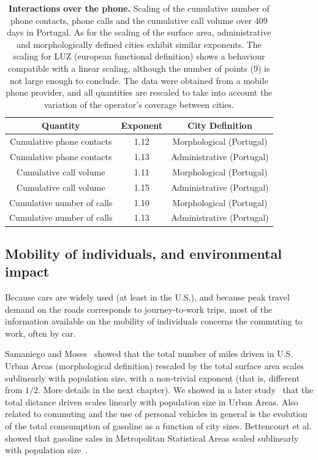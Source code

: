 \begin{table}[!h]
    \centering
\begin{tabular}{|ccc|}
\hline
Quantity & Exponent & City Definition\\
\hline
Cumulative phone contacts & 1.12 & Morphological (Portugal)\\
Cumulative phone contacts & 1.13 & Administrative (Portugal)\\
\hline
Cumulative call volume & 1.11 & Morphological (Portugal)\\
Cumulative call volume & 1.15 & Administrative (Portugal)\\
\hline
Cumulative number of calls & 1.10 & Morphological (Portugal)\\
Cumulative number of calls & 1.13 & Administrative (Portugal)\\
\hline
\end{tabular}
\caption{{\bf Interactions over the phone.} Scaling of the cumulative number of
    phone contacts, phone calls and the cumulative call volume over $409$ days
    in Portugal. As for the scaling of the surface area, administrative and
    morphologically defined cities exhibit similar exponents. The scaling for
    LUZ (european functional definition) shows a behaviour compatible with a
    linear scaling, although the number of points (9) is not large enough to
    conclude. The data were obtained from a mobile phone provider, and all
    quantities are rescaled to take into
account the variation of the operator's coverage between cities.}
\end{table}

\subsection{Mobility of individuals, and environmental impact}
\label{sub:mobility}

Because cars are widely used (at least in the U.S.), and because peak travel
demand on the roads corresponds to journey-to-work trips, most of the
information available on the mobility of individuals concerns the commuting to
work, often by car. 

Samaniego and Moses~\cite{Samaniego:2008} showed that the total number of miles
driven in U.S. Urban Areas (morphological definition) rescaled by the total
surface area scales sublinearly with population size, with a non-trivial
exponent (that is, different from $1/2$. More details in the next chapter). We
showed in a later study~\cite{Louf:2014_scaling} that the total distance driven
scales linearly with population size in Urban Areas.
Also related to commuting and the use of personal vehicles in general is the
evolution of the total comsumption of gasoline as a function of city sizes.
Bettencourt et al. showed that gasoline sales in Metropolitan Statistical Areas
scaled sublinearly with population size~\cite{Bettencourt:2007}. 

